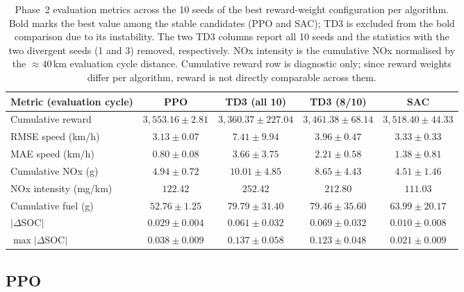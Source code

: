 \begin{table}[H]
  \centering
  \small
  \begin{tabular}{lcccc}
    \hline
    \textbf{Metric (evaluation cycle)} & \textbf{PPO} & \textbf{TD3 (all 10)} & \textbf{TD3 (8/10)} & \textbf{SAC} \\
    \hline
    Cumulative reward            & $3{,}553.16 \pm 2.81$ & $3{,}360.37 \pm 227.04$ & $3{,}461.38 \pm 68.14$ & $3{,}518.40 \pm 44.33$ \\
    \ac{RMSE} speed (km/h)       & $\mathbf{3.13 \pm 0.07}$ & $7.41 \pm 9.94$ & $3.96 \pm 0.47$ & $3.33 \pm 0.33$ \\
    \ac{MAE} speed (km/h)        & $\mathbf{0.80 \pm 0.08}$ & $3.66 \pm 3.75$ & $2.21 \pm 0.58$ & $1.38 \pm 0.81$ \\
    Cumulative \ac{NOx} (g)      & $4.94 \pm 0.72$ & $10.01 \pm 4.85$ & $8.65 \pm 4.43$ & $\mathbf{4.51 \pm 1.46}$ \\
    \ac{NOx} intensity (mg/km)   & $122.42$ & $252.42$ & $212.80$ & $\mathbf{111.03}$ \\
    Cumulative fuel (g)          & $\mathbf{52.76 \pm 1.25}$ & $79.79 \pm 31.40$ & $79.46 \pm 35.60$ & $63.99 \pm 20.17$ \\
    $|\Delta$\ac{SOC}$|$         & $0.029 \pm 0.004$ & $0.061 \pm 0.032$ & $0.069 \pm 0.032$ & $\mathbf{0.010 \pm 0.008}$ \\
    $\max|\Delta$\ac{SOC}$|$     & $0.038 \pm 0.009$ & $0.137 \pm 0.058$ & $0.123 \pm 0.048$ & $\mathbf{0.021 \pm 0.009}$ \\
    \hline
  \end{tabular}
  \caption[Phase~2 evaluation summary]{Phase~2 evaluation metrics across the 10 seeds of the best reward-weight configuration per algorithm. Bold marks the best value among the stable candidates (PPO and SAC); \ac{TD3} is excluded from the bold comparison due to its instability. The two \ac{TD3} columns report all 10 seeds and the statistics with the two divergent seeds (1 and 3) removed, respectively. \ac{NOx} intensity is the cumulative \ac{NOx} normalised by the $\approx 40$\,km evaluation cycle distance. Cumulative reward row is diagnostic only; since reward weights differ per algorithm, reward is not directly comparable across them.}
  \label{tab:phase2_summary}
\end{table}

\subsection{PPO}
\label{subsec:results_phase2_ppo}

